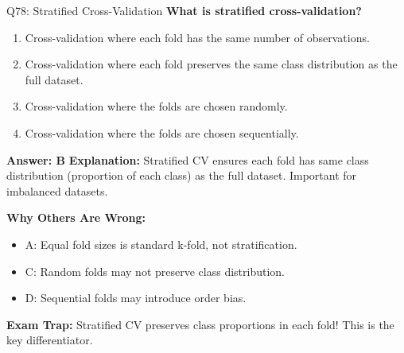 \documentclass[8pt]{beamer}
\begin{document}
	\begin{frame}{Q78: Stratified Cross-Validation}
		\fontsize{6.5}{7.5}\selectfont
		\textbf{What is stratified cross-validation?}
		
		\begin{enumerate}
			\item Cross-validation where each fold has the same number of observations.
			\item Cross-validation where each fold preserves the same class distribution as the full dataset.
			\item Cross-validation where the folds are chosen randomly.
			\item Cross-validation where the folds are chosen sequentially.
		\end{enumerate}
		
		\vspace{0.05cm}
		\textcolor{myblue}{\textbf{Answer: B}}
		\vspace{0.05cm}
		\textcolor{myblue}{\textbf{Explanation:}} Stratified CV ensures each fold has same class distribution (proportion of each class) as the full dataset. Important for imbalanced datasets.
		
		\vspace{0.05cm}
		\textcolor{myred}{\textbf{Why Others Are Wrong:}}
		\begin{itemize}
			\item \textcolor{myred}{A:} Equal fold sizes is standard k-fold, not stratification.
			\item \textcolor{myred}{C:} Random folds may not preserve class distribution.
			\item \textcolor{myred}{D:} Sequential folds may introduce order bias.
		\end{itemize}
		
		\textcolor{myred}{\textbf{Exam Trap:}} Stratified CV preserves \textcolor{myblue}{class proportions} in each fold! This is the key differentiator.
	\end{frame}
	
\end{document}
